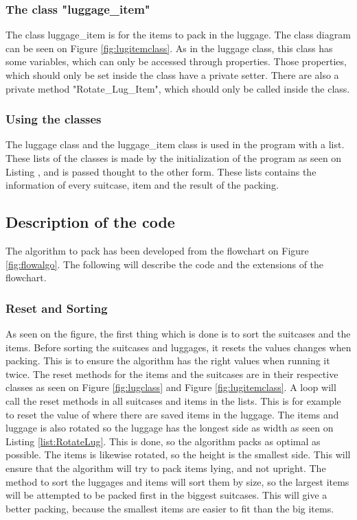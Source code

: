 \subsubsection{The class "luggage\_item"}
The class luggage\_item is for the items to pack in the luggage. The class diagram can be seen on Figure \ref{fig:lugitemclass}. As in the luggage class, this class has some variables, which can only be accessed through properties. Those properties, which should only be set inside the class have a private setter. There are also a private method "Rotate\_Lug\_Item", which should only be called inside the class.
\subsubsection{Using the classes}
The luggage class and the luggage\_item class is used in the program with a list. These lists of the classes is made by the initialization of the program as seen on Listing , and is passed thought to the other form. These lists contains the information of every suitcase, item and the result of the packing.
\subsection{Description of the code}
The algorithm to pack has been developed from the flowchart on Figure \ref{fig:flowalgo}. The following will describe the code and the extensions of the flowchart.
\subsubsection{Reset and Sorting}
As seen on the figure, the first thing which is done is to sort the suitcases and the items. Before sorting the suitcases and luggages, it resets the values changes when packing. This is to ensure the algorithm has the right values when running it twice. The reset methods for the items and the suitcases are in their respective classes as seen on Figure \ref{fig:lugclass} and Figure \ref{fig:lugitemclass}. A loop will call the reset methods in all suitcases and items in the lists. This is for example to reset the value of where there are saved items in the luggage. The items and luggage is also rotated so the luggage has the longest side as width as seen on Listing \ref{list:RotateLug}. This is done, so the algorithm packs as optimal as possible. The items is likewise rotated, so the height is the smallest side. This will ensure that the algorithm will try to pack items lying, and not upright.
The method to sort the luggages and items will sort them by size, so the largest items will be attempted to be packed first in the biggest suitcases. This will give a better packing, because the smallest items are easier to fit than the big items.
